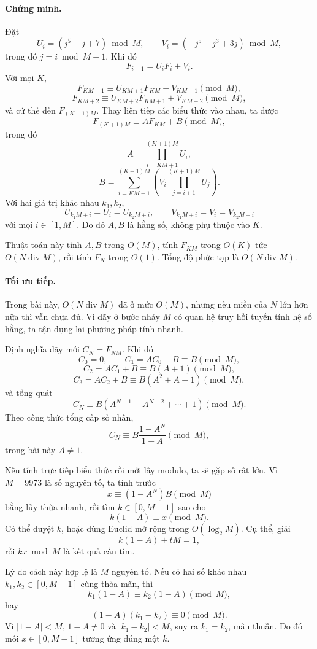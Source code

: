 \documentclass[11pt]{article}
\begin{document}
\paragraph{Chứng minh.}
Đặt
\[
  U_i=(j^5-j+7)\bmod M,\qquad
  V_i=(-j^5+j^3+3j)\bmod M,
\]
trong đó $j=i\bmod M+1$. Khi đó
\[
  F_{i+1}=U_iF_i+V_i.
\]
Với mọi $K$,
\[
  F_{KM+1}\equiv U_{KM+1}F_{KM}+V_{KM+1}\pmod M,
\]
\[
  F_{KM+2}\equiv U_{KM+2}F_{KM+1}+V_{KM+2}\pmod M,
\]
và cứ thế đến $F_{(K+1)M}$. Thay liên tiếp các biểu thức vào nhau, ta được
\[
  F_{(K+1)M}\equiv A F_{KM}+B\pmod M,
\]
trong đó
\[
  A=\prod_{i=KM+1}^{(K+1)M} U_i,
\]
\[
  B=\sum_{i=KM+1}^{(K+1)M}
    \left(V_i\prod_{j=i+1}^{(K+1)M}U_j\right).
\]
Với hai giá trị khác nhau $k_1,k_2$,
\[
  U_{k_1M+i}=U_i=U_{k_2M+i},\qquad
  V_{k_1M+i}=V_i=V_{k_2M+i}
\]
với mọi $i\in[1,M]$. Do đó $A,B$ là hằng số, không phụ thuộc vào $K$.

Thuật toán này tính $A,B$ trong $O(M)$, tính $F_{KM}$ trong $O(K)$ tức
$O(N\operatorname{div}M)$, rồi tính $F_N$ trong $O(1)$. Tổng độ phức tạp là
$O(N\operatorname{div}M)$.

\paragraph{Tối ưu tiếp.}
Trong bài này, $O(N\operatorname{div}M)$ đã ở mức $O(M)$, nhưng nếu miền của
$N$ lớn hơn nữa thì vẫn chưa đủ. Vì dãy ở bước nhảy $M$ có quan hệ truy hồi
tuyến tính hệ số hằng, ta tận dụng lại phương pháp tính nhanh.

Định nghĩa dãy mới $C_N=F_{NM}$. Khi đó
\[
  C_0=0,\qquad C_1=AC_0+B\equiv B\pmod M,
\]
\[
  C_2=AC_1+B\equiv B(A+1)\pmod M,
\]
\[
  C_3=AC_2+B\equiv B(A^2+A+1)\pmod M,
\]
và tổng quát
\[
  C_N\equiv B(A^{N-1}+A^{N-2}+\cdots+1)\pmod M.
\]
Theo công thức tổng cấp số nhân,
\[
  C_N\equiv B\frac{1-A^N}{1-A}\pmod M,
\]
trong bài này $A\ne 1$.

Nếu tính trực tiếp biểu thức rồi mới lấy modulo, ta sẽ gặp số rất lớn. Vì
$M=9973$ là số nguyên tố, ta tính trước
\[
  x\equiv (1-A^N)B\pmod M
\]
bằng lũy thừa nhanh, rồi tìm $k\in[0,M-1]$ sao cho
\[
  k(1-A)\equiv x\pmod M.
\]
Có thể duyệt $k$, hoặc dùng Euclid mở rộng trong $O(\log_2 M)$. Cụ thể, giải
\[
  k(1-A)+tM=1,
\]
rồi $kx\bmod M$ là kết quả cần tìm.

Lý do cách này hợp lệ là $M$ nguyên tố. Nếu có hai số khác nhau
$k_1,k_2\in[0,M-1]$ cùng thỏa mãn, thì
\[
  k_1(1-A)\equiv k_2(1-A)\pmod M,
\]
hay
\[
  (1-A)(k_1-k_2)\equiv 0\pmod M.
\]
Vì $|1-A|<M$, $1-A\ne0$ và $|k_1-k_2|<M$, suy ra $k_1=k_2$, mâu thuẫn. Do đó
mỗi $x\in[0,M-1]$ tương ứng đúng một $k$.
\end{document}
